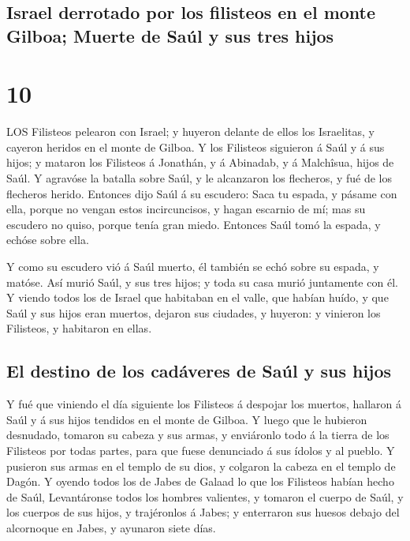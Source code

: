 \hypertarget{israel-derrotado-por-los-filisteos-en-el-monte-gilboa-muerte-de-sauxfal-y-sus-tres-hijos}{%
\subsection{Israel derrotado por los filisteos en el monte Gilboa;
Muerte de Saúl y sus tres
hijos}\label{israel-derrotado-por-los-filisteos-en-el-monte-gilboa-muerte-de-sauxfal-y-sus-tres-hijos}}

\hypertarget{section-9}{%
\section{10}\label{section-9}}

 LOS Filisteos pelearon con Israel; y huyeron delante de
ellos los Israelitas, y cayeron heridos en el monte de Gilboa.
 Y los Filisteos siguieron á Saúl y á sus hijos; y mataron
los Filisteos á Jonathán, y á Abinadab, y á Malchîsua, hijos de Saúl.
 Y agravóse la batalla sobre Saúl, y le alcanzaron los
flecheros, y fué de los flecheros herido.  Entonces dijo
Saúl á su escudero: Saca tu espada, y pásame con ella, porque no vengan
estos incircuncisos, y hagan escarnio de mí; mas su escudero no quiso,
porque tenía gran miedo. Entonces Saúl tomó la espada, y echóse sobre
ella.

 Y como su escudero vió á Saúl muerto, él también se echó
sobre su espada, y matóse.  Así murió Saúl, y sus tres
hijos; y toda su casa murió juntamente con él.  Y viendo
todos los de Israel que habitaban en el valle, que habían huído, y que
Saúl y sus hijos eran muertos, dejaron sus ciudades, y huyeron: y
vinieron los Filisteos, y habitaron en ellas.

\hypertarget{el-destino-de-los-caduxe1veres-de-sauxfal-y-sus-hijos}{%
\subsection{El destino de los cadáveres de Saúl y sus
hijos}\label{el-destino-de-los-caduxe1veres-de-sauxfal-y-sus-hijos}}

 Y fué que viniendo el día siguiente los Filisteos á
despojar los muertos, hallaron á Saúl y á sus hijos tendidos en el monte
de Gilboa.  Y luego que le hubieron desnudado, tomaron su
cabeza y sus armas, y enviáronlo todo á la tierra de los Filisteos por
todas partes, para que fuese denunciado á sus ídolos y al pueblo.
 Y pusieron sus armas en el templo de su dios, y colgaron
la cabeza en el templo de Dagón.  Y oyendo todos los de
Jabes de Galaad lo que los Filisteos habían hecho de Saúl, 
Levantáronse todos los hombres valientes, y tomaron el cuerpo de Saúl, y
los cuerpos de sus hijos, y trajéronlos á Jabes; y enterraron sus huesos
debajo del alcornoque en Jabes, y ayunaron siete días.

